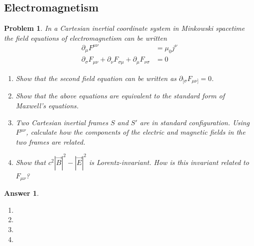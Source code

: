 \documentclass[a4paper]{article}
\newtheorem{ans}{Answer}[subsection]
\theoremstyle{new}
\newtheorem{qns}{Problem}[section]
\begin{document}
\subsection*{Electromagnetism}
\begin{qns}
In a Cartesian inertial coordinate system in Minkowski spacetime the field equations of electromagnetism can be written
\begin{align}
    \partial_\mu F^{\mu\nu}&=\mu_0j^\nu\nonumber\\
    \partial_\sigma F_{\mu\nu}+\partial_\nu F_{\sigma\mu}+\partial_\mu F_{\nu\sigma}&=0\nonumber
\end{align}
\begin{enumerate}[label=(\alph*)]
\item  Show that the second field equation can be written as $\partial_{[\sigma}F_{\mu\nu]}=0$. 
\item Show that the above equations are equivalent to the standard form of Maxwell’s equations.
\item Two Cartesian inertial frames $S$ and $S'$ are in standard configuration. Using $F^{\mu\nu}$, calculate how the components of the electric and magnetic fields in the two frames are related. 
\item  Show that $c^2|\vec{B}|^2-|\vec{E}|^2$ is Lorentz-invariant. How is this invariant related to $F_{\mu\nu}$?
\end{enumerate}
\end{qns}
\begin{ans}\leavevmode
\begin{enumerate}[label=(\alph*)]
\item

\item 

\item 

\item 
\end{enumerate}
\end{ans}
\newpage
\end{document}
